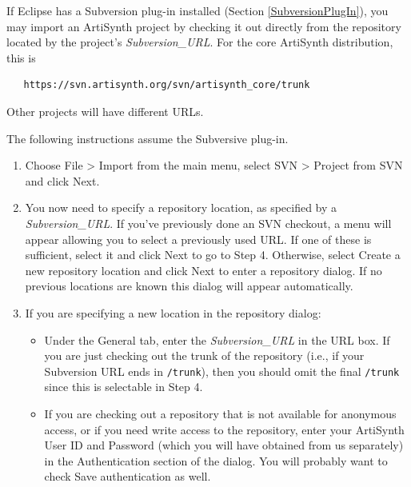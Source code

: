 If Eclipse has a Subversion plug-in installed (Section
\ref{SubversionPlugIn}), you may import an ArtiSynth project by
checking it out directly from the repository located by
the project's {\it Subversion\_URL}. For the core ArtiSynth
distribution, this is 
\begin{verbatim}
   https://svn.artisynth.org/svn/artisynth_core/trunk
\end{verbatim}
Other projects will have different URLs.

The following instructions assume the Subversive plug-in.

\begin{enumerate}

\item Choose {\sf File > Import} from the main menu, select {\sf SVN >
Project from SVN} and click {\sf Next}.

\item You now need to specify a repository location, as specified by a
{\it Subversion\_URL}.  If you've previously done an SVN checkout, a
menu will appear allowing you to select a previously used URL. If one
of these is sufficient, select it and click {\sf Next} to go to Step
4. Otherwise, select {\sf Create a new repository location} and click
{\sf Next} to enter a repository dialog. If no previous locations are
known this dialog will appear automatically.

\item If you are specifying a new location in the repository dialog:

\begin{itemize}

\item Under the {\sf General} tab, enter the {\it Subversion\_URL} in the
{\sf URL} box. If you are just checking out the trunk of the
repository (i.e., if your Subversion URL ends in {\tt /trunk}), then
you should omit the final {\tt /trunk} since this is selectable in Step 4.

\item If you are checking out a repository that is not available for
anonymous access, or if you need write access to the repository, enter
your ArtiSynth User ID and Password (which you will have obtained from
us separately) in the {\sf Authentication} section of the dialog.
You will probably want to check {\sf Save authentication} as well.



\end{itemize}
\end{enumerate}
